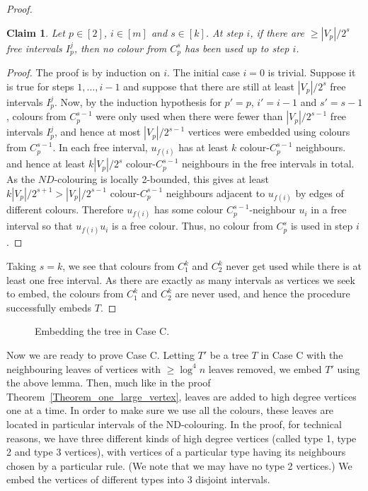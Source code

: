 \documentclass{article}
\newtheorem{claim}[lemma]{Claim}
\theoremstyle{definition}
\begin{document}
\begin{proof}
\begin{claim}
Let $p\in [2]$, $i\in [m]$ and $s\in [k]$.
At step $i$, if there are $\geq |V_p|/2^{s}$ free intervals $I_p^j$, then no colour from $C_p^s$ has been used up to step $i$.
\end{claim}
\begin{proof}
The proof is by induction on $i$. The initial case $i=0$ is trivial.
Suppose it is true for steps $1,\ldots,i-1$ and suppose that there are still at least $|V_p|/2^s$ free intervals $I_p^j$. Now, by the induction hypothesis for $p'=p$, $i'=i-1$ and $s'=s-1$, colours from $C_p^{s-1}$ were only used when there were fewer than $|V_p|/2^{s-1}$ free intervals $I_p^j$, and hence at most $|V_p|/2^{s-1}$ vertices were embedded using colours from $C_p^{s-1}$. In each free interval, $u_{f(i)}$ has at least $k$ colour-$C_p^{s-1}$ neighbours.
and hence at least $k|V_p|/2^s$ colour-$C_p^{s-1}$ neighbours in the free intervals in total. As the $ND$-colouring is locally 2-bounded, this gives at least
$k|V_p|/2^{s+1}> |V_p|/2^{s-1}$ colour-$C_p^{s-1}$ neighbours adjacent to $u_{f(i)}$ by edges of different colours. Therefore $u_{f(i)}$ has some colour $C_p^{s-1}$-neighbour $u_i$ in a free interval so that $u_{f(i)}u_i$ is a free colour. Thus, no colour from $C_p^s$ is used in step $i$.
\end{proof}
Taking $s=k$, we see that colours from $C_1^k$ and $C_2^k$ never get used while there is at least one free interval. As there are exactly as many intervals as vertices we seek to embed, the colours from $C_1^k$ and $C_2^k$ are never used, and hence the procedure successfully embeds $T$.
\end{proof}

\begin{figure}[h]
\begin{center}
{

}
\end{center}

\vspace{-0.6cm}

\caption{Embedding the tree in Case C.}\label{Figure_many_vertex}
\end{figure}

Now we are ready to prove Case C. Letting $T'$ be a tree $T$ in Case C with the neighbouring leaves of vertices with $\geq \log^4 n$ leaves removed, we embed $T'$ using the above lemma.
Then, much like in the proof Theorem~\ref{Theorem_one_large_vertex}, leaves are added to high degree vertices one at a time. In order to make sure we use all the colours, these leaves are located in particular intervals of the ND-colouring. In the proof, for technical reasons, we have three different kinds of high degree vertices (called type 1, type 2 and type 3 vertices), with vertices of a particular type having its neighbours chosen by a particular rule. (We note that we may have no type 2 vertices.) We embed the vertices of different types into 3 disjoint intervals.
\end{document}
